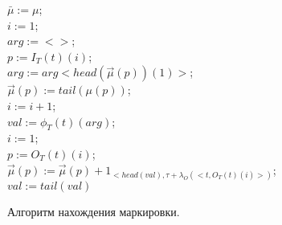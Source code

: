 \begin{minipage}[ht]{0.8\textwidth}
	\begin{algorithm}[H]
		\Begin
		{
			$\bar{\mu}:=\mu$;\\
			$i:=1 $;\\
			$ arg:=<> $;\\
			{
				$ p:=I_T(t)(i) $;\\
				$ arg:=arg<head(\vec{\mu}(p))(1)> $;\\
				$ \vec{\mu}(p):=tail(\mu(p)) $;\\
				$ i:=i+1 $;\\	
			}
			$ val:=\phi_T(t)(arg) $;\\
			$ i:=1 $;\\
			{
				$ p:=O_T(t)(i) $;\\
				$ \vec{\mu}(p):=\vec{\mu}(p)+1_{<head(val),\tau+\lambda_O(<t,O_T(t)(i)>) } $;\\
				$ val:=tail(val) $
			}
		}
		
		\caption{Алгоритм нахождения маркировки.}
	\end{algorithm}
\end{minipage}